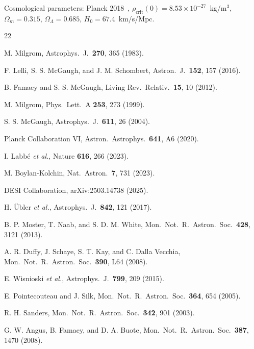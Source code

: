 \documentclass[
    aps,
    prd,
    reprint,
    superscriptaddress,
    nofootinbib,
    floatfix
]{revtex4-2}
\begin{document}
Cosmological parameters: Planck 2018~\cite{Planck2018},
$\rho_\text{crit}(0) = 8.53 \times 10^{-27}$~kg/m$^3$,
$\Omega_m = 0.315$, $\Omega_\Lambda = 0.685$,
$H_0 = 67.4$~km/s/Mpc.

\begin{thebibliography}{22}

M. Milgrom, Astrophys.\ J.\ \textbf{270}, 365 (1983).

F. Lelli, S. S. McGaugh, and J. M. Schombert,
Astron.\ J.\ \textbf{152}, 157 (2016).

B. Famaey and S. S. McGaugh,
Living Rev.\ Relativ.\ \textbf{15}, 10 (2012).

M. Milgrom, Phys.\ Lett.\ A \textbf{253}, 273 (1999).

S. S. McGaugh, Astrophys.\ J.\ \textbf{611}, 26 (2004).

Planck Collaboration VI,
Astron.\ Astrophys.\ \textbf{641}, A6 (2020).

I. Labb\'e \emph{et al.}, Nature \textbf{616}, 266 (2023).

M. Boylan-Kolchin,
Nat.\ Astron.\ \textbf{7}, 731 (2023).

DESI Collaboration, arXiv:2503.14738 (2025).

H. \"Ubler \emph{et al.}, Astrophys.\ J.\ \textbf{842}, 121 (2017).

B. P. Moster, T. Naab, and S. D. M. White,
Mon.\ Not.\ R.\ Astron.\ Soc.\ \textbf{428}, 3121 (2013).

A. R. Duffy, J. Schaye, S. T. Kay, and C. Dalla Vecchia,
Mon.\ Not.\ R.\ Astron.\ Soc.\ \textbf{390}, L64 (2008).

E. Wisnioski \emph{et al.},
Astrophys.\ J.\ \textbf{799}, 209 (2015).

E. Pointecouteau and J. Silk,
Mon.\ Not.\ R.\ Astron.\ Soc.\ \textbf{364}, 654 (2005).

R. H. Sanders,
Mon.\ Not.\ R.\ Astron.\ Soc.\ \textbf{342}, 901 (2003).

G. W. Angus, B. Famaey, and D. A. Buote,
Mon.\ Not.\ R.\ Astron.\ Soc.\ \textbf{387}, 1470 (2008).


\end{thebibliography}
\end{document}
